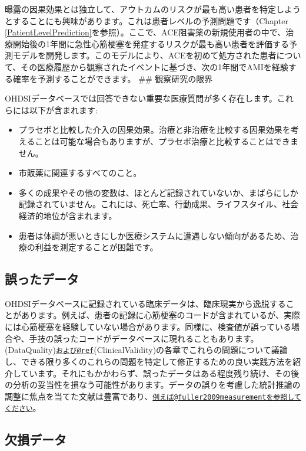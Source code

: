 \documentclass[
  11pt]{book}
\providecommand{\tightlist}{%
  \setlength{\itemsep}{0pt}\setlength{\parskip}{0pt}}
\theoremstyle{definition}
\theoremstyle{definition}
\theoremstyle{definition}
\theoremstyle{definition}
\theoremstyle{remark}
\begin{document}
曝露の因果効果とは独立して、アウトカムのリスクが最も高い患者を特定しようとすることにも興味があります。これは患者レベルの予測問題です（Chapter \ref{PatientLevelPrediction}を参照）。ここで、ACE阻害薬の新規使用者の中で、治療開始後の1年間に急性心筋梗塞を発症するリスクが最も高い患者を評価する予測モデルを開発します。このモデルにより、ACEを初めて処方された患者について、その医療履歴から観察されたイベントに基づき、次の1年間でAMIを経験する確率を予測することができます。
\#\# 観察研究の限界


OHDSIデータベースでは回答できない重要な医療質問が多く存在します。これらには以下が含まれます:

\begin{itemize}
\tightlist
\item
  プラセボと比較した介入の因果効果。治療と非治療を比較する因果効果を考えることは可能な場合もありますが、プラセボ治療と比較することはできません。
\item
  市販薬に関連するすべてのこと。
\item
  多くの成果やその他の変数は、ほとんど記録されていないか、まばらにしか記録されていません。これには、死亡率、行動成果、ライフスタイル、社会経済的地位が含まれます。
\item
  患者は体調が悪いときにしか医療システムに遭遇しない傾向があるため、治療の利益を測定することが困難です。
\end{itemize}

\subsection{誤ったデータ}\label{ux8aa4ux3063ux305fux30c7ux30fcux30bf}

OHDSIデータベースに記録されている臨床データは、臨床現実から逸脱することがあります。例えば、患者の記録に心筋梗塞のコードが含まれているが、実際には心筋梗塞を経験していない場合があります。同様に、検査値が誤っている場合や、手技の誤ったコードがデータベースに現れることもあります。\citet{ref}(DataQuality)\href{mailto:および@ref}{\nolinkurl{および@ref}}(ClinicalValidity)の各章でこれらの問題について議論し、できる限り多くのこれらの問題を特定して修正するための良い実践方法を紹介しています。それにもかかわらず、誤ったデータはある程度残り続け、その後の分析の妥当性を損なう可能性があります。データの誤りを考慮した統計推論の調整に焦点を当てた文献は豊富であり、\href{mailto:例えば@fuller2009measurementを参照してください}{\nolinkurl{例えば@fuller2009measurementを参照してください}}。

\subsection{欠損データ}\label{ux6b20ux640dux30c7ux30fcux30bf}
\end{document}
